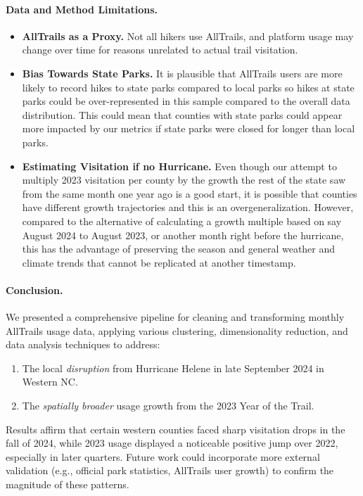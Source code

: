 \documentclass[12pt]{article}
\begin{document}
\paragraph{Data and Method Limitations.}
\begin{itemize}
    \item \textbf{AllTrails as a Proxy.} Not all hikers use AllTrails, and platform usage may change over time for reasons unrelated to actual trail visitation.
    \item \textbf{Bias Towards State Parks.} It is plausible that AllTrails users are more likely to record hikes to state parks compared to local parks so hikes at state parks could be over-represented in this sample compared to the overall data distribution. This could mean that counties with state parks could appear more impacted by our metrics if state parks were closed for longer than local parks.
    \item \textbf{Estimating Visitation if no Hurricane.} Even though our attempt to multiply 2023 visitation per county by the growth the rest of the state saw from the same month one year ago is a good start, it is possible that counties have different growth trajectories and this is an overgeneralization. However, compared to the alternative of calculating a growth multiple based on say August 2024 to August 2023, or another month right before the hurricane, this has the advantage of preserving the season and general weather and climate trends that cannot be replicated at another timestamp.
\end{itemize}

\paragraph{Conclusion.}
We presented a comprehensive pipeline for cleaning and transforming monthly AllTrails usage data, applying various clustering, dimensionality reduction, and data analysis techniques to address:
\begin{enumerate}
    \item The local \emph{disruption} from Hurricane Helene in late September 2024 in Western NC.
    \item The \emph{spatially broader} usage growth from the 2023 Year of the Trail.
\end{enumerate}
Results affirm that certain western counties faced sharp visitation drops in the fall of 2024, while 2023 usage displayed a noticeable positive jump over 2022, especially in later quarters. Future work could incorporate more external validation (e.g., official park statistics, AllTrails user growth) to confirm the magnitude of these patterns.
\end{document}
